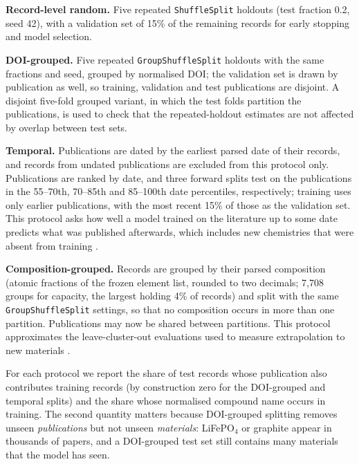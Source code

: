 \documentclass[journal=jcisd8,manuscript=article,layout=traditional]{achemso}
\begin{document}
\textbf{Record-level random.} Five repeated \texttt{ShuffleSplit} holdouts (test fraction 0.2, seed 42), with a validation set of 15\% of the remaining records for early stopping and model selection.

\textbf{DOI-grouped.} Five repeated \texttt{GroupShuffleSplit} holdouts with the same fractions and seed, grouped by normalised DOI; the validation set is drawn by publication as well, so training, validation and test publications are disjoint. A disjoint five-fold grouped variant, in which the test folds partition the publications, is used to check that the repeated-holdout estimates are not affected by overlap between test sets.

\textbf{Temporal.} Publications are dated by the earliest parsed date of their records, and records from undated publications are excluded from this protocol only. Publications are ranked by date, and three forward splits test on the publications in the 55--70th, 70--85th and 85--100th date percentiles, respectively; training uses only earlier publications, with the most recent 15\% of those as the validation set. This protocol asks how well a model trained on the literature up to some date predicts what was published afterwards, which includes new chemistries that were absent from training \cite{sheridan2013timesplit}.

\textbf{Composition-grouped.} Records are grouped by their parsed composition (atomic fractions of the frozen element list, rounded to two decimals; 7,708 groups for capacity, the largest holding 4\% of records) and split with the same \texttt{GroupShuffleSplit} settings, so that no composition occurs in more than one partition. Publications may now be shared between partitions. This protocol approximates the leave-cluster-out evaluations used to measure extrapolation to new materials \cite{meredig2018cluster,witman2025matfold}.

For each protocol we report the share of test records whose publication also contributes training records (by construction zero for the DOI-grouped and temporal splits) and the share whose normalised compound name occurs in training. The second quantity matters because DOI-grouped splitting removes unseen \emph{publications} but not unseen \emph{materials}: LiFePO$_4$ or graphite appear in thousands of papers, and a DOI-grouped test set still contains many materials that the model has seen.
\end{document}
